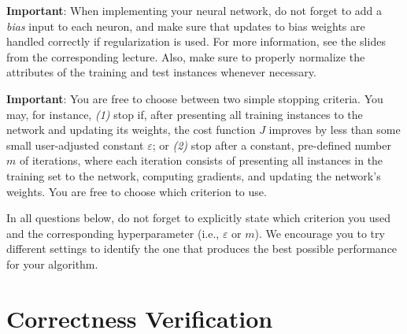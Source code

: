 \documentclass{article}
\begin{document}
\vspace{2.25cm}

\begin{mybox}[boxblue] 
\textbf{Important}: When implementing your neural network, do not forget to add a \textit{bias} input to each neuron, and make sure that updates to bias weights are handled correctly if regularization is used. For more information, see the slides from the corresponding lecture. Also, make sure to properly normalize the attributes of the training and test instances whenever necessary.
\end{mybox}

%
%

\begin{mybox}[boxblue] 
\textbf{Important}: You are free to choose between two simple stopping criteria. You may, for instance, \textit{(1)} stop if, after presenting all training instances to the network and updating its weights, the cost function $J$ improves by less than some small user-adjusted constant $\varepsilon$; or \textit{(2)} stop after a constant, pre-defined number $m$ of iterations, where each iteration consists of presenting all instances in the training set to the network, computing gradients, and updating the network's weights. You are free to choose which criterion to use.

\vspace{0.3cm}

In all questions below, do not forget to explicitly state which criterion you used and the corresponding hyperparameter (i.e., $\varepsilon$ or $m$). We encourage you to try different settings to identify the one that produces the best possible performance for your algorithm.
\end{mybox}

\vspace{1.25cm}





\newpage
\section{Correctness Verification}
\label{correctness_verif}

\vspace{0.3cm}
\end{document}
